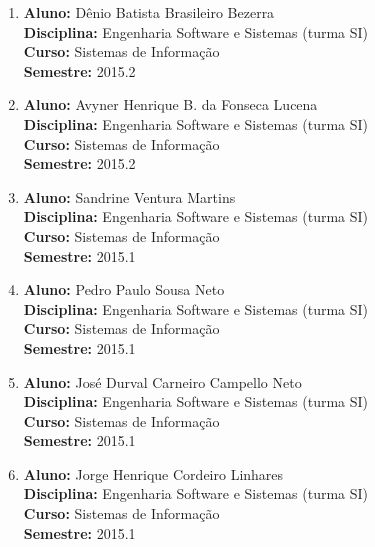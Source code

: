\documentclass[a4paper,oneside,10pt]{article}
\begin{document}
\begin{enumerate}
\item   \textbf{Aluno:} Dênio Batista Brasileiro Bezerra \mbox{} \\
        \textbf{Disciplina:}  Engenharia Software e Sistemas (turma SI)\\
        \textbf{Curso:} Sistemas de Informação\\
        \textbf{Semestre:} 2015.2

\item   \textbf{Aluno:} Avyner Henrique B. da Fonseca Lucena \mbox{} \\
        \textbf{Disciplina:}  Engenharia Software e Sistemas (turma SI)\\
        \textbf{Curso:} Sistemas de Informação\\
        \textbf{Semestre:} 2015.2

\item   \textbf{Aluno:} Sandrine Ventura Martins \mbox{} \\
        \textbf{Disciplina:}  Engenharia Software e Sistemas (turma SI)\\
        \textbf{Curso:} Sistemas de Informação\\
        \textbf{Semestre:} 2015.1

\item   \textbf{Aluno:} Pedro Paulo Sousa Neto \mbox{} \\
        \textbf{Disciplina:}  Engenharia Software e Sistemas (turma SI)\\
        \textbf{Curso:} Sistemas de Informação\\
        \textbf{Semestre:} 2015.1

\item   \textbf{Aluno:} José Durval Carneiro Campello Neto \mbox{} \\
        \textbf{Disciplina:}  Engenharia Software e Sistemas (turma SI)\\
        \textbf{Curso:} Sistemas de Informação\\
        \textbf{Semestre:} 2015.1

\item   \textbf{Aluno:} Jorge Henrique Cordeiro Linhares \mbox{} \\
        \textbf{Disciplina:}  Engenharia Software e Sistemas (turma SI)\\
        \textbf{Curso:} Sistemas de Informação\\
        \textbf{Semestre:} 2015.1


\end{enumerate}
\end{document}
